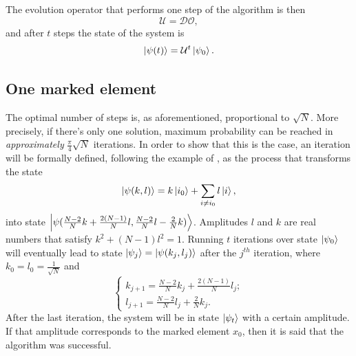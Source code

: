 \documentclass[../../dissertation.tex]{subfiles}
\begin{document}
The evolution operator that performs one step of the algorithm is then
\begin{equation}
	\mathcal{U} = \mathcal{D}\mathcal{O},
\end{equation}
and after $t$ steps the state of the system is
\begin{equation}
	\ket{\psi(t)} = \mathcal{U}^t\ket{\psi_0}.
	\label{eq:groverFinalState}
\end{equation}

\subsection{One marked element}
The optimal number of steps is, as aforementioned, proportional to $\sqrt{N}$.
More precisely, if there's only one solution, maximum probability can be
reached in \textit{approximately} $\frac{\pi}{4}\sqrt{N}$ iterations. In order
to show that this is the case, an iteration will be formally defined, following the example of \cite{boyer1996}, as
the process that transforms the state
\begin{equation}
	\ket{\psi(k,l)} = k\ket{i_0} + \sum_{i\neq i_0}l\ket{i},
	\label{eq:groverQuantumRegister}
\end{equation}
into state $\ket{\psi(\frac{N-2}{N}k + \frac{2(N-1)}{N}l, \frac{N-2}{N}l -
\frac{2}{N}k)}$. Amplitudes $l$ and $k$ are real numbers that satisfy $k^2 +
(N-1)l^2=1$. Running $t$ iterations over state $\ket{\psi_0}$ will eventually
lead to state $\ket{\psi_j} = \ket{\psi(k_j,l_j)}$ after the $j^{th}$ iteration,
where $k_0 = l_0 = \frac{1}{\sqrt{N}}$ and
\begin{equation}
	\begin{cases}
		k_{j+1} = \frac{N-2}{N}k_j + \frac{2(N-1)}{N}l_j;
		\\l_{j+1} = \frac{N-2}{N}l_j + \frac{2}{N}k_j.
	\end{cases}\label{eq:groverKandJ1}
\end{equation}
After the last iteration, the system will be in state $\ket{\psi_t}$ with a
certain amplitude. If that amplitude corresponds to the marked element $x_0$,
then it is said that the algorithm was successful.\par 
\end{document}
